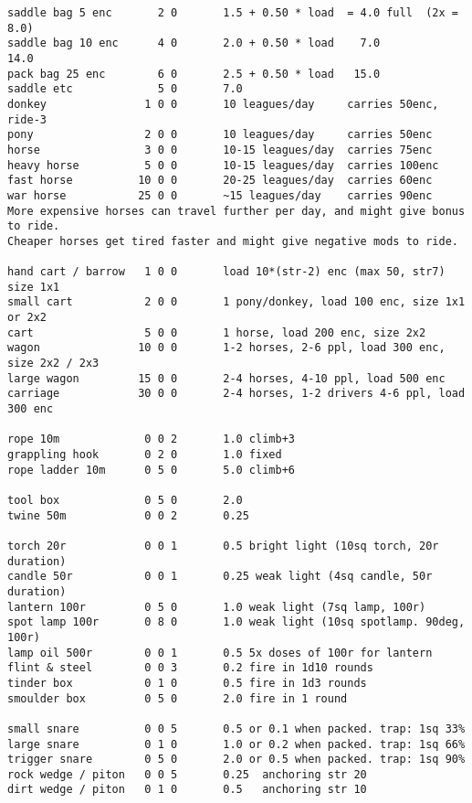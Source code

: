 \begin{verbatim}
saddle bag 5 enc       2 0       1.5 + 0.50 * load  = 4.0 full  (2x = 8.0)
saddle bag 10 enc      4 0       2.0 + 0.50 * load    7.0            14.0
pack bag 25 enc        6 0       2.5 + 0.50 * load   15.0
saddle etc             5 0       7.0
donkey               1 0 0       10 leagues/day     carries 50enc, ride-3
pony                 2 0 0       10 leagues/day     carries 50enc
horse                3 0 0       10-15 leagues/day  carries 75enc
heavy horse          5 0 0       10-15 leagues/day  carries 100enc
fast horse          10 0 0       20-25 leagues/day  carries 60enc
war horse           25 0 0       ~15 leagues/day    carries 90enc
More expensive horses can travel further per day, and might give bonus to ride.
Cheaper horses get tired faster and might give negative mods to ride.

hand cart / barrow   1 0 0       load 10*(str-2) enc (max 50, str7) size 1x1
small cart           2 0 0       1 pony/donkey, load 100 enc, size 1x1 or 2x2
cart                 5 0 0       1 horse, load 200 enc, size 2x2
wagon               10 0 0       1-2 horses, 2-6 ppl, load 300 enc, size 2x2 / 2x3
large wagon         15 0 0       2-4 horses, 4-10 ppl, load 500 enc
carriage            30 0 0       2-4 horses, 1-2 drivers 4-6 ppl, load 300 enc

rope 10m             0 0 2       1.0 climb+3
grappling hook       0 2 0       1.0 fixed
rope ladder 10m      0 5 0       5.0 climb+6

tool box             0 5 0       2.0
twine 50m            0 0 2       0.25

torch 20r            0 0 1       0.5 bright light (10sq torch, 20r duration)
candle 50r           0 0 1       0.25 weak light (4sq candle, 50r duration)
lantern 100r         0 5 0       1.0 weak light (7sq lamp, 100r)
spot lamp 100r       0 8 0       1.0 weak light (10sq spotlamp. 90deg, 100r)
lamp oil 500r        0 0 1       0.5 5x doses of 100r for lantern
flint & steel        0 0 3       0.2 fire in 1d10 rounds
tinder box           0 1 0       0.5 fire in 1d3 rounds
smoulder box         0 5 0       2.0 fire in 1 round

small snare          0 0 5       0.5 or 0.1 when packed. trap: 1sq 33%
large snare          0 1 0       1.0 or 0.2 when packed. trap: 1sq 66%
trigger snare        0 5 0       2.0 or 0.5 when packed. trap: 1sq 90%
rock wedge / piton   0 0 5       0.25  anchoring str 20
dirt wedge / piton   0 1 0       0.5   anchoring str 10
\end{verbatim}
\normalsize







